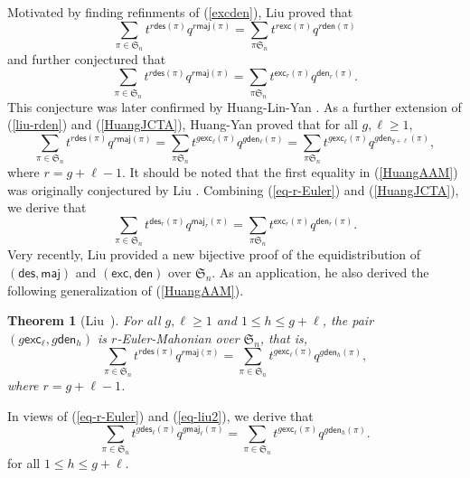 \documentclass[12pt]{article}
\numberwithin{equation}{section}
\theoremstyle{plain}
\newtheorem{theorem}{Theorem}[section]
\def\des{\mathsf{des}}
\def\maj{\mathsf{maj}}
\def\exc{\mathsf{exc}}
\def\den{\mathsf{den}}
\begin{document}
Motivated by finding refinments  of (\ref{excden}), Liu \cite{Liujcta}  proved that
\begin{equation}\label{liu-rden}
	\sum_{\pi\in \mathfrak{S}_n}t^{r\des(\pi)}q^{r\maj(\pi)}=\sum_{\pi\mathfrak{S}_n}t^{r\exc(\pi)} q^{r\den(\pi)}
\end{equation}
and further conjectured that 
\begin{equation}\label{HuangJCTA}
	\sum_{\pi\in \mathfrak{S}_n}t^{r\des(\pi)}q^{r\maj(\pi)}=\sum_{\pi\mathfrak{S}_n}t^{ \exc_r(\pi)} q^{\den_r(\pi)} .
\end{equation}
This conjecture  was later confirmed by Huang-Lin-Yan \cite{Huang-lin-yan jcta}. 
As  a further  extension of (\ref{liu-rden}) and  (\ref{HuangJCTA}), Huang-Yan \cite{Huang-yan AAM} proved that for all $g,\ell\geq 1$,   
\begin{equation}\label{HuangAAM}
	\sum_{\pi\in \mathfrak{S}_n}t^{r\des(\pi)}q^{r\maj(\pi)}=\sum_{\pi\mathfrak{S}_n}t^{ g\exc_\ell(\pi)} q^{g\den_\ell(\pi)}=\sum_{\pi\mathfrak{S}_n}t^{ g\exc_\ell(\pi)} q^{g\den_{g+\ell}(\pi)},
\end{equation}
where $r=g+\ell-1$.   It should be noted  that the first equality in (\ref{HuangAAM}) was originally conjectured by Liu \cite{Liujcta}. 
 Combining (\ref{eq-r-Euler}) and (\ref{HuangJCTA}), we derive that 
\begin{equation}\label{eq-des}
	\sum_{\pi\in \mathfrak{S}_n}t^{ \des_r(\pi)}q^{ \maj_r(\pi)}=\sum_{\pi\mathfrak{S}_n}t^{  \exc_r(\pi)} q^{ \den_r(\pi)}. 
\end{equation}
 Very recently, Liu \cite{Liu3} provided  a new bijective proof of the equidistribution of $(\des, \maj)$ and $(\exc, \den)$ over $\mathfrak{S}_n$. As an application, he also derived the following generalization of (\ref{HuangAAM}).
\begin{theorem}[Liu~\cite{Liu3}]\label{th-Liu3}
	For all $g, \ell\geq 1$ and $1\leq h\leq g+\ell$, 
	the pair $(g\exc_{\ell}, g\den_{h})$ is $r$-Euler-Mahonian over $\mathfrak{S}_n$, that is, 
	\begin{equation}\label{eq-liu2}
		\sum_{\pi\in\mathfrak{S}_n} t^{r\des(\pi)} q^{r\maj(\pi)}
		=\sum_{\pi\in \mathfrak{S}_n} t^{g\exc_\ell(\pi)}  q^{g\den_h(\pi)},
	\end{equation}
	where $r=g+\ell-1$. 
\end{theorem}
In views of (\ref{eq-r-Euler}) and (\ref{eq-liu2}), we derive that
\begin{equation}\label{eq-liu3}
	\sum_{\pi\in\mathfrak{S}_n} t^{g\des_{\ell}(\pi)} q^{g\maj_\ell(\pi)}
	=\sum_{\pi\in \mathfrak{S}_n} t^{g\exc_\ell(\pi)}  q^{g\den_h(\pi)}.
\end{equation}
for all $1\leq h\leq g+\ell$. 
\end{document}
